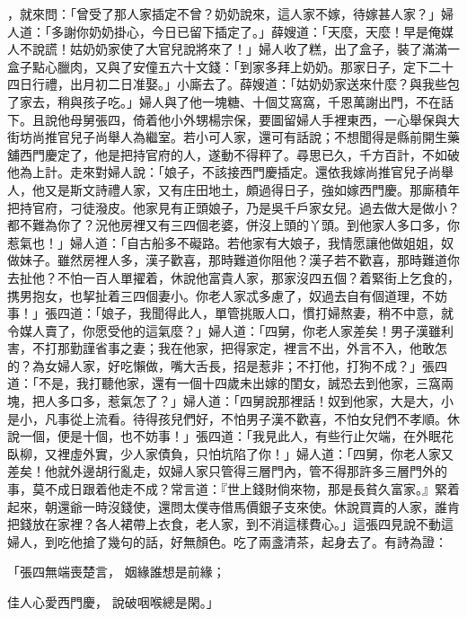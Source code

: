 ，就來問：「曾受了那人家插定不曾？奶奶說來，這人家不嫁，待嫁甚人家？」婦人道：「多謝你奶奶掛心，今日已留下插定了。」薛嫂道：「天麼，天麼！早是俺媒人不說謊！姑奶奶家使了大官兒說將來了！」婦人收了糕，出了盒子，裝了滿滿一盒子點心臘肉，又與了安僮五六十文錢：「到家多拜上奶奶。那家日子，定下二十四日行禮，出月初二日准娶。」小廝去了。薛嫂道：「姑奶奶家送來什麼？與我些包了家去，稍與孩子吃。」婦人與了他一塊糖、十個艾窩窩，千恩萬謝出門，不在話下。且說他母舅張四，倚着他小外甥楊宗保，要圖留婦人手裡東西，一心舉保與大街坊尚推官兒子尚舉人為繼室。若小可人家，還可有話說；不想聞得是縣前開生藥舖西門慶定了，他是把持官府的人，遂動不得秤了。尋思已久，千方百計，不如破他為上計。走來對婦人說：「娘子，不該接西門慶插定。還依我嫁尚推官兒子尚舉人，他又是斯文詩禮人家，又有庄田地土，頗過得日子，強如嫁西門慶。那廝積年把持官府，刁徒潑皮。他家見有正頭娘子，乃是吳千戶家女兒。過去做大是做小？都不難為你了？況他房裡又有三四個老婆，併沒上頭的丫頭。到他家人多口多，你惹氣也！」婦人道：「自古船多不礙路。若他家有大娘子，我情愿讓他做姐姐，奴做妹子。雖然房裡人多，漢子歡喜，那時難道你阻他？漢子若不歡喜，那時難道你去扯他？不怕一百人單擢着，休說他富貴人家，那家沒四五個？着緊街上乞食的，携男抱女，也挈扯着三四個妻小。你老人家忒多慮了，奴過去自有個道理，不妨事！」張四道：「娘子，我聞得此人，單管挑販人口，慣打婦熬妻，稍不中意，就令媒人賣了，你愿受他的這氣麼？」婦人道：「四舅，你老人家差矣！男子漢雖利害，不打那勤謹省事之妻；我在他家，把得家定，裡言不出，外言不入，他敢怎的？為女婦人家，好吃懶做，嘴大舌長，招是惹非；不打他，打狗不成？」張四道：「不是，我打聽他家，還有一個十四歲未出嫁的閨女，誠恐去到他家，三窩兩塊，把人多口多，惹氣怎了？」婦人道：「四舅說那裡話！奴到他家，大是大，小是小，凡事從上流看。待得孩兒們好，不怕男子漢不歡喜，不怕女兒們不孝順。休說一個，便是十個，也不妨事！」張四道：「我見此人，有些行止欠端，在外眠花臥柳，又裡虛外實，少人家債負，只怕坑陷了你！」婦人道：「四舅，你老人家又差矣！他就外邊胡行亂走，奴婦人家只管得三層門內，管不得那許多三層門外的事，莫不成日跟着他走不成？常言道：『世上錢財倘來物，那是長貧久富家。』緊着起來，朝還爺一時沒錢使，還問太僕寺借馬價銀子支來使。休說買賣的人家，誰肯把錢放在家裡？各人裙帶上衣食，老人家，到不消這樣費心。」這張四見說不動這婦人，到吃他搶了幾句的話，好無顏色。吃了兩盞清茶，起身去了。有詩為證：

「張四無端喪楚言，  姻緣誰想是前緣；

佳人心愛西門慶，  說破咽喉總是閑。」

